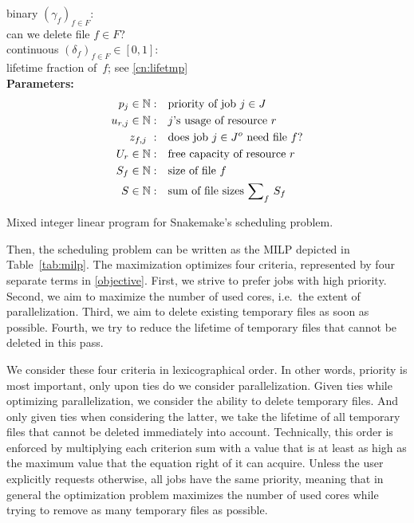 \documentclass[10pt,a4paper,twocolumn]{article}
\begin{document}
\begin{table}
\begin{minipage}[t]{0.44\textwidth}
binary $(\gamma_f)_{f\in F}$: \\
can we delete file $f\in F$? \\[1ex]
continuous $(\delta_f)_{f\in F} \in [0,1]$: \\
lifetime fraction of~$f$; see \eqref{cn:lifetmp} \\[2ex]
\textbf{Parameters:}
\begin{align*}
p_j\in\mathbb{N}     :& \quad \text{priority of job $j\in J$} \\
u_{r,j}\in\mathbb{N} :& \quad \text{$j$'s usage of resource~$r$} \\
z_{f,j}\     :& \quad \text{does job~$j\in J^o$ need file~$f$?} \\
U_r\in\mathbb{N}     :& \quad \text{free capacity of resource~$r$}\\
S_f\in\mathbb{N}     :& \quad \text{size of file~$f$} \\
S\in\mathbb{N}       :& \quad \text{sum of file sizes $\sum\nolimits_f\, S_f$} \\
\end{align*}
\end{minipage}
\caption{Mixed integer linear program for Snakemake's scheduling problem.}
\label{tab:milp}
\end{table}

Then, the scheduling problem can be written as the MILP depicted in Table~\ref{tab:milp}.
The maximization optimizes four criteria, represented by four separate terms in \eqref{objective}.
First, we strive to prefer jobs with high priority.
Second, we aim to maximize the number of used cores, i.e.\ the extent of parallelization.
Third, we aim to delete existing temporary files as soon as possible.
Fourth, we try to reduce the lifetime of temporary files that cannot be deleted in this pass.

We consider these four criteria in lexicographical order.
In other words, priority is most important, only upon ties do we consider parallelization.
Given ties while optimizing parallelization, we consider the ability to delete temporary files.
And only given ties when considering the latter, we take the lifetime of all temporary files that cannot be deleted immediately into account.
Technically, this order is enforced by multiplying each criterion sum with a value that is at least as high as the maximum value that the equation right of it can acquire.
Unless the user explicitly requests otherwise, all jobs have the same priority, meaning that in general the optimization problem maximizes the number of used cores while trying to remove as many temporary files as possible.
\end{document}
